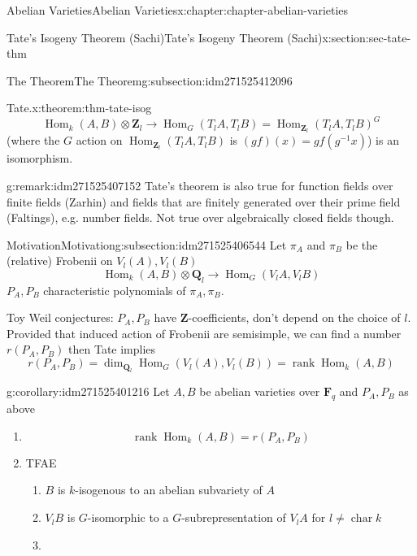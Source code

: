 \documentclass[oneside,10pt,]{book}
\numberwithin{equation}{section}
\newcommand{\ZZ}{\mathbf{Z}}
\newcommand{\QQ}{\mathbf{Q}}
\newcommand{\FF}{\mathbf{F}}
\DeclareMathOperator{\Hom}{Hom}
\DeclareMathOperator{\rank}{rank}
\DeclareMathOperator{\characteristic}{char}
\begin{document}
\begin{chapterptx}{Abelian Varieties}{}{Abelian Varieties}{}{}{x:chapter:chapter-abelian-varieties}
\begin{sectionptx}{Tate's Isogeny Theorem (Sachi)}{}{Tate's Isogeny Theorem (Sachi)}{}{}{x:section:sec-tate-thm}
\begin{subsectionptx}{The Theorem}{}{The Theorem}{}{}{g:subsection:idm271525412096}
\begin{theorem}{Tate.}{}{x:theorem:thm-tate-isog}
\begin{equation*}
\Hom_{k}(A,B)\otimes \ZZ_l \to \Hom_G(T_l A, T_lB) = \Hom_{\ZZ_l}(T_lA,T_lB)^G
\end{equation*}
(where the \(G\) action on \(\Hom_{\ZZ_l}(T_l A, T_lB)\) is \((gf)(x) = gf(g^{-1}x)\)) is an isomorphism.%
\end{theorem}
\begin{remark}{}{g:remark:idm271525407152}%
Tate's theorem is also true for function fields over finite fields (Zarhin) and fields that are finitely generated over their prime field (Faltings), e.g. number fields. Not true over algebraically closed fields though.%
\end{remark}
\end{subsectionptx}
%
%
\typeout{************************************************}
\typeout{************************************************}
%
\begin{subsectionptx}{Motivation}{}{Motivation}{}{}{g:subsection:idm271525406544}
Let \(\pi_A\) and \(\pi_B\) be the (relative) Frobenii on \(V_l(A), V_l(B)\)%
\begin{equation*}
\Hom_{k}(A,B)\otimes \QQ_l \to \Hom_G(V_l A, V_lB)
\end{equation*}
\(P_A,P_B\) characteristic polynomials of \(\pi_A,\pi_B\).%
\par
Toy Weil conjectures: \(P_A, P_B\) have \(\ZZ\)-coefficients, don't depend on the choice of \(l\). Provided that induced action of Frobenii are semisimple, we can find a number \(r(P_A,P_B)\) then Tate implies%
\begin{equation*}
r(P_A,P_B) = \dim_{\QQ_l} \Hom_G (V_l(A), V_l(B)) = \rank \Hom_k(A,B)
\end{equation*}
%
\begin{corollary}{}{}{g:corollary:idm271525401216}%
Let \(A, B\) be abelian varieties over \(\FF_q\) and \(P_A, P_B\) as above%
\begin{enumerate}
\item{}%
\begin{equation*}
\rank \Hom_k(A,B) = r(P_A,P_B)
\end{equation*}
%
\item{}TFAE%
\begin{enumerate}
\item{}\(B\) is \(k\)-isogenous to an abelian subvariety of \(A\)%
\item{}\(V_lB\) is \(G\)-isomorphic to a \(G\)-subrepresentation of \(V_lA\) for \(l \ne \characteristic k\)%
\item{}%

\end{enumerate}
\end{enumerate}
\end{corollary}
\end{subsectionptx}
\end{sectionptx}
\end{chapterptx}
\end{document}
